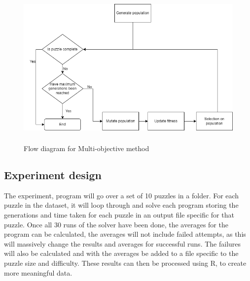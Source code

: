 \documentclass[a4paper,11pt]{article}
\begin{document}
\begin{figure}[H]
	\centering
	\includegraphics[height=8cm,width=15cm]{./Diagrams/multiobjectiveFlowchart}
	\caption{Flow diagram for Multi-objective method}
\end{figure}

\subsection{Experiment design}

The experiment, program will go over a set of 10 puzzles in a folder. For each puzzle in the dataset, it will loop through and solve each program storing the generations and time taken for each puzzle in an output file specific for that puzzle. Once all 30 runs of the solver have been done, the averages for the program can be calculated, the averages will not include failed attempts, as this will massively change the results and averages for successful runs. The failures will also be calculated and with the averages be added to a file specific to the puzzle size and difficulty. These results can then be processed using R, to create more meaningful data.
\end{document}
